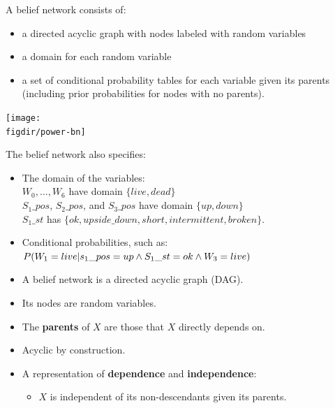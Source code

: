 \documentclass[12pt]{beamer} %
\newcommand{\figdir}{../../figures/ch06}
\begin{document}
\begin{slide}
A belief network consists of:
\begin{itemize}
\item a directed acyclic graph with nodes
labeled with random variables
\item a domain for each random
variable 
\item a set of conditional probability tables for each variable given
its parents (including prior probabilities for nodes
with no parents).
\end{itemize}
\end{slide}
\begin{slide}
\begin{center}
\texttt{[image: \\figdir/power-bn]}
\end{center}
\end{slide}



\begin{slide}
The belief network also specifies:
\begin{itemize}
\item The domain of the variables:\\
$W_0,\ldots,W_6$ have domain $\{live,dead\}$\\
$S_1\_pos$, $S_2\_pos$, and $S_3\_pos$ have  domain $\{up,down\}$\\
$S_1\_st$ has $\{ok,upside\_down,short,intermittent,broken\}$.
\item Conditional probabilities, such as:\\
$P(W_1=live|s_1\_pos=up \wedge \mbox{} S_1\_st=ok \wedge \mbox{} W_3=live)$\\
\end{itemize}
\end{slide}

\begin{slide}
\begin{itemize}
\item A belief network is a directed acyclic graph (DAG).
\item Its nodes are random variables.
\item The \textbf{parents} of $X$ are those that $X$ directly depends on.
\item Acyclic by construction.
\item A representation of \textbf{dependence} and \textbf{independence}:
\begin{itemize}
\item $X$ is independent of its non-descendants given its parents.
\end{itemize}
\end{itemize}
\end{slide}
\end{document}

